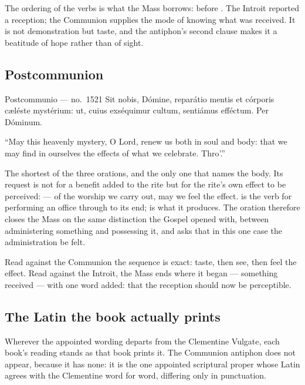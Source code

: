 The ordering of the verbs is what the Mass borrows:  before
. The Introit reported a reception; the Communion supplies the
mode of knowing what was received. It is not demonstration but taste, and the
antiphon's second clause makes it a beatitude of hope rather than of sight.

\subsection{Postcommunion }

\begin{appointed}{Postcommunio --- no.\ 1521}
Sit nobis, Dómine, reparátio mentis et córporis cæléste mystérium: ut, cuius
exséquimur cultum, sentiámus efféctum. Per Dóminum.
\end{appointed}

\begin{englishwitness}
``May this heavenly mystery, O Lord, renew us both in soul and body: that we may
find in ourselves the effects of what we celebrate. Thro'.''
\end{englishwitness}

The shortest of the three orations, and the only one that names the body. Its
request is not for a benefit added to the rite but for the rite's own effect to
be perceived:  --- of the
worship we carry out, may we feel the effect.  is the verb for
performing an office through to its end;  is what it produces.
The oration therefore closes the Mass on the same distinction the Gospel opened
with, between administering something and possessing it, and asks that in this
one case the administration be felt.

Read against the Communion the sequence is exact: taste, then see, then feel the
effect. Read against the Introit, the Mass ends where it began --- something
received --- with one word added: that the reception should now be perceptible.

\subsection{The Latin the book actually prints}

Wherever the appointed wording departs from the Clementine Vulgate, each
book's reading stands as that book prints it. The Communion antiphon does not appear, because it has none: it is the
one appointed scriptural proper whose Latin agrees with the Clementine word for
word, differing only in punctuation.

